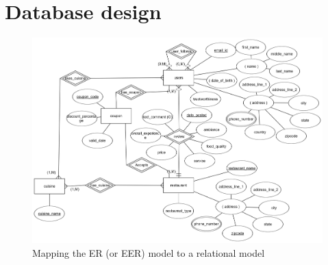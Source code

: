 \documentclass[12pt]{report}
\begin{document}
\section*{Database design}
\begin{figure}[H]
\begin{center}
\caption{Mapping the ER (or EER) model to a relational model}
\includegraphics[scale=0.13]{er}
\end{center}
\newpage
\end{figure}
\end{document}
